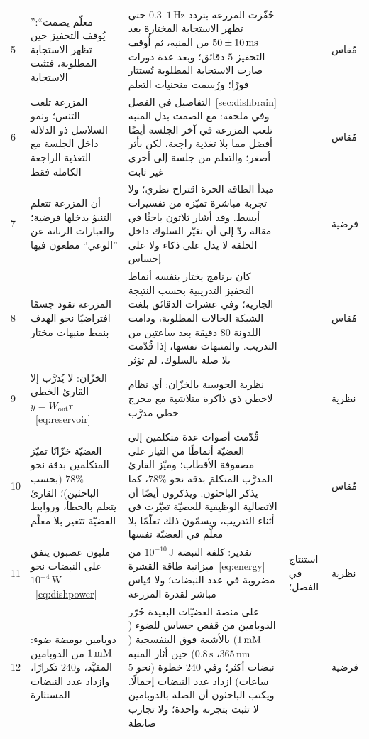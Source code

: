 {\begin{longtable}{>{\raggedright}p{0.5cm}>{\raggedright}p{4.0cm}>{\raggedright}p{5.6cm}>{\raggedright}p{2.3cm}>{\raggedright\arraybackslash}p{1.7cm}}
5 & ”معلّم يصمت“: يُوقف التحفيز حين تظهر الاستجابة المطلوبة، فتثبت الاستجابة & حُفّزت المزرعة بتردد $0.3\text{--}1\,\text{Hz}$ حتى تظهر الاستجابة المختارة بعد $50\pm10\,\text{ms}$ من المنبه، ثم أُوقف التحفيز $5$ دقائق؛ وبعد عدة دورات صارت الاستجابة المطلوبة تُستثار فورًا؛ ورُسمت منحنيات التعلم & \cite{Shahaf2001} & مُقاس \\
6 & المزرعة تلعب التنس؛ ونمو السلاسل ذو الدلالة داخل الجلسة مع التغذية الراجعة الكاملة فقط & التفاصيل في الفصل~\ref{sec:dishbrain} وفي ملحقه: مع الصمت بدل المنبه تلعب المزرعة في آخر الجلسة أيضًا أفضل مما بلا تغذية راجعة، لكن بأثر أصغر؛ والتعلم من جلسة إلى أخرى غير ثابت & \cite{Kagan2022} & مُقاس \\
7 & أن المزرعة تتعلم التنبؤ بدخلها فرضية؛ والعبارات الرنانة عن ”الوعي“ مطعون فيها & مبدأ الطاقة الحرة اقتراح نظري؛ ولا تجربة مباشرة تميّزه من تفسيرات أبسط. وقد أشار ثلاثون باحثًا في مقالة ردّ إلى أن تغيّر السلوك داخل الحلقة لا يدل على ذكاء ولا على إحساس & \cite{Friston2010,Balci2023} & فرضية \\
8 & المزرعة تقود جسمًا افتراضيًا نحو الهدف بنمط منبهات مختار & كان برنامج يختار بنفسه أنماط التحفيز التدريبية بحسب النتيجة الجارية؛ وفي عشرات الدقائق بلغت الشبكة الحالات المطلوبة، ودامت اللدونة $80$ دقيقة بعد ساعتين من التدريب. والمنبهات نفسها، إذا قُدّمت بلا صلة بالسلوك، لم تؤثر & \cite{Bakkum2008} & مُقاس \\
9 & الخزّان: لا يُدرَّب إلا القارئ الخطي $y=W_{\text{out}}\mathbf r$~\eqref{eq:reservoir} & نظرية الحوسبة بالخزّان: أي نظام لاخطي ذي ذاكرة متلاشية مع مخرج خطي مدرَّب & \cite{Maass2002,JaegerHaas2004} & نظرية \\
10 & العضيّة خزّانًا تميّز المتكلمين بدقة نحو $78\%$ (بحسب الباحثين)؛ القارئ يتعلم بالخطأ، وروابط العضيّة تتغير بلا معلّم & قُدّمت أصوات عدة متكلمين إلى العضيّة أنماطًا من التيار على مصفوفة الأقطاب؛ وميّز القارئ المدرَّب المتكلمَ بدقة نحو $78\%$، كما يذكر الباحثون. ويذكرون أيضًا أن الاتصالية الوظيفية للعضيّة تغيّرت في أثناء التدريب، ويسمّون ذلك تعلّمًا بلا معلّم في العضيّة نفسها & \cite{Cai2023} & مُقاس \\
11 & مليون عصبون ينفق على النبضات نحو $10^{-4}\,\text{W}$~\eqref{eq:dishpower} & تقدير: كلفة النبضة $10^{-10}\,\text{J}$ من ميزانية طاقة القشرة~\eqref{eq:energy} مضروبة في عدد النبضات؛ ولا قياس مباشر لقدرة المزرعة & استنتاج في الفصل؛ \cite{Attwell2001} & نظرية \\
12 & دوبامين بومضة ضوء: $1\,\text{mM}$ من الدوبامين المقيَّد، و$240$ تكرارًا، وازداد عدد النبضات المستثارة & على منصة العضيّات البعيدة حُرّر الدوبامين من قفص حساس للضوء ($1\,\text{mM}$) بالأشعة فوق البنفسجية ($365\,\text{nm}$، $0.8\,\text{s}$) حين أثار المنبه نبضات أكثر؛ وفي $240$ خطوة (نحو $5$ ساعات) ازداد عدد النبضات إجمالًا. ويكتب الباحثون أن الصلة بالدوبامين لا تثبت بتجربة واحدة؛ ولا تجارب ضابطة & \cite{Jordan2024} & فرضية \\

\end{longtable}}
